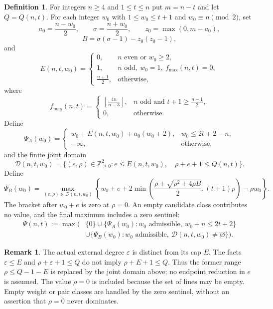 \documentclass[11pt,a4paper]{amsart}
\theoremstyle{plain}
\theoremstyle{definition}
\newtheorem{definition}[theorem]{Definition}
\newtheorem{remark}[theorem]{Remark}
\begin{document}
\begin{definition}\label{def:psi}
For integers $n\ge4$ and $1\le t\le n$ put $m=n-t$ and let
$Q=Q(n,t)$. For each integer $w_0$ with $1\le w_0\le t+1$ and
$w_0\equiv n\pmod2$, set
\[
  a_0=\frac{n-w_0}{2},\qquad
  \sigma=\frac{n+w_0}{2},\qquad
  z_0=\max(0,m-a_0),
\]
\[
  B=\sigma(\sigma-1)-z_0(z_0-1),
\]
and
\[
  E(n,t,w_0)=
  \begin{cases}
    0,& n\text{ even or }w_0\ge2,\\
    1,& n\text{ odd},\ w_0=1,\ f_{\max}(n,t)=0,\\
    \frac{n+1}{2},&\text{otherwise},
  \end{cases}
\]
where
\[
  f_{\max}(n,t)=
  \begin{cases}
    \left\lfloor\frac{4n}{n-3}\right\rfloor,
      & n\text{ odd and }t+1\ge\frac{n-1}{2},\\
    0,&\text{otherwise}.
  \end{cases}
\]
Define
\[
  \Psi_A(w_0)=
  \begin{cases}
    w_0+E(n,t,w_0)+a_0(w_0+2),
      & w_0\le2t+2-n,\\
    -\infty,&\text{otherwise},
  \end{cases}
\]
and the finite joint domain
\[
 \mathcal D(n,t,w_0)=\{(e,\rho)\in\mathbb Z_{\ge0}^2:
       e\le E(n,t,w_0),\quad \rho+e+1\le Q(n,t)\}.
\]
Define
\[
 \Psi_B(w_0)=\max_{(e,\rho)\in\mathcal D(n,t,w_0)}
 \left\{w_0+e+
 2\min\left(\frac{\rho+\sqrt{\rho^2+4\rho B}}2,(t+1)\rho\right)
 -\rho w_0\right\}.
\]
The bracket after $w_0+e$ is zero at $\rho=0$. An empty candidate class
contributes no value, and the final maximum includes a zero sentinel:
\[
\begin{aligned}
 \Psi(n,t):=\max\bigl(&\{0\}\cup
   \{\Psi_A(w_0): w_0\text{ admissible},\ w_0+n\le2t+2\}\\
   &\cup\{\Psi_B(w_0):w_0\text{ admissible},\ \mathcal D(n,t,w_0)\ne\varnothing\}
                  \bigr).
\end{aligned}
\]
\end{definition}

\begin{remark}\label{rem:r0}
The actual external degree $\varepsilon$ is distinct from its cap $E$.
The facts $\varepsilon\le E$ and $\rho+\varepsilon+1\le Q$ do not imply
$\rho+E+1\le Q$. Thus the former range $\rho\le Q-1-E$ is replaced by the
joint domain above; no endpoint reduction in $e$ is assumed. The value
$\rho=0$ is included because the set of lines may be empty. Empty weight or
pair classes are handled by the zero sentinel, without an assertion that
$\rho=0$ never dominates.
\end{remark}
\end{document}
